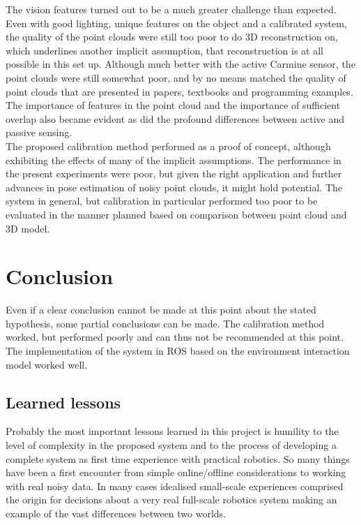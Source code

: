 The vision features turned out to be a much greater challenge than expected. Even with good lighting, unique features on the object and a calibrated system, the quality of the point clouds were still too poor to do 3D reconstruction on, which underlines another implicit assumption, that reconstruction is at all possible in this set up. Although much better with the active Carmine sensor, the point clouds were still somewhat poor, and by no means matched the quality of point clouds that are presented in papers, textbooks and programming examples. The importance of features in the point cloud and the importance of sufficient overlap also became evident as did the profound differences between active and passive sensing.\\

The proposed calibration method performed as a proof of concept, although exhibiting the effects of many of the implicit assumptions. The performance in the present experiments were poor, but given the right application and further advances in pose estimation of noisy point clouds, it might hold potential. The system in general, but calibration in particular performed too poor to be evaluated in the manner planned based on comparison between point cloud and 3D model.\\

\chapter{Conclusion}
Even if a clear conclusion cannot be made at this point about the stated hypothesis, some partial conclusions can be made. The calibration method worked, but performed poorly and can thus not be recommended at this point. The implementation of the system in ROS based on the environment interaction model worked well. \\


\section{Learned lessons}
Probably the most important lessons learned in this project is humility to the level of complexity in the proposed system and to the process of developing a complete system as first time experience with practical robotics. So many things have been a first encounter from simple online/offline considerations to working with real noisy data. In many cases idealised small-scale experiences comprised the origin for decisions about a very real full-scale robotics system making an example of the vast differences between two worlds.
